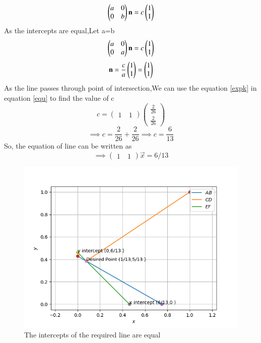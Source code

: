 \documentclass[journal,12pt,twocolumn]{IEEEtran}
\begin{document}
\begin{flushleft}
\begin{equation}
\begin{pmatrix}a & 0 \\ 0 & b\end{pmatrix}\mathbf{n} = c \begin{pmatrix}1 \\ 1\end{pmatrix}
\end{equation}
As the intercepts are equal,Let a=b
\begin{equation}
\begin{pmatrix}a & 0 \\ 0 & a\end{pmatrix}\mathbf{n} = c \begin{pmatrix}1 \\ 1\end{pmatrix}
\end{equation}
\begin{equation}
\mathbf{n} = \frac{c}{a}\begin{pmatrix}1\\1\end{pmatrix} = \begin{pmatrix}1\\1\end{pmatrix}
\end{equation}
As the line passes through point of intersection,We can use the equation \eqref{expk} in equation \eqref{equ} to find the value of c\\
\begin{equation}
c=
\begin{pmatrix}
	1 &\
	1
\end{pmatrix}
\begin{pmatrix}
	\frac{2}{26} \\
	\frac{2}{26}
\end{pmatrix}
\end{equation}
\begin{equation}
\implies c=\frac{2}{26}+\frac{2}{26}
\implies c=\frac{6}{13}
\end{equation}
So, the equation of line can be written as
\begin{equation}
\implies
\begin{pmatrix}
	1 &\
	1
\end{pmatrix}
	{\vec{x}} = 6/13
\end{equation}
\begin{figure}[!ht]
\centering
\includegraphics[width=\columnwidth]{Assignment_1}
 \caption{The intercepts of the required line are equal}
\end{figure}
\end{flushleft}
\end{document}
